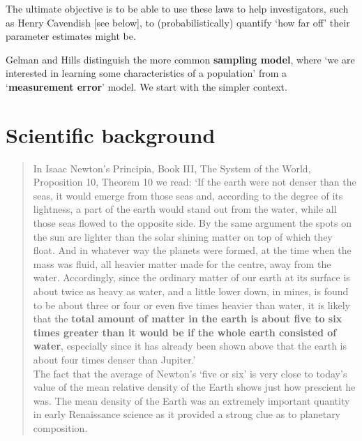 \documentclass[]{book}
\begin{document}
The ultimate objective is to be able to use these laws to help investigators, such as Henry Cavendish {[}see below{]}, to (probabilistically) quantify `how far off' their parameter estimates might be.

Gelman and Hills distinguish the more common \textbf{sampling model}, where `we are interested in learning some characteristics of a population' from a `\textbf{measurement error}' model. We start with the simpler context.

\hypertarget{scientific-background}{%
\section{Scientific background}\label{scientific-background}}

\begin{quote}
In Isaac Newton's Principia, Book III, The System of the World, Proposition 10, Theorem 10 we read: `If the earth were not denser than the seas, it would emerge from those seas and, according to the degree of its lightness, a part of the earth would stand out from the water, while all those seas flowed to the opposite side. By the same argument the spots on the sun are lighter than the solar shining matter on top of which they float. And in whatever way the planets were formed, at the time when the mass was fluid, all heavier matter made for the centre, away from the water. Accordingly, since the ordinary matter of our earth at its surface is about twice as heavy as water, and a little lower down, in mines, is found to be about three or four or even five times heavier than water, it is likely that the \textbf{total amount of matter in the earth is about five to six times greater than it would be if the whole earth consisted of water}, especially since it has already been shown above that the earth is about four times denser than Jupiter.'\\
\hspace*{0.333em}\hspace*{0.333em}\hspace*{0.333em}\hspace*{0.333em}The fact that the average of Newton's `five or six' is very close to today's value of the mean relative density of the Earth shows just how prescient he was. The mean density of the Earth was an extremely important quantity in early Renaissance science as it provided a strong clue as to planetary composition.
\end{quote}
\end{document}
